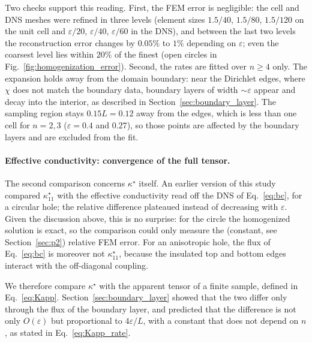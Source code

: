 \documentclass{article}
\begin{document}
Two checks support this reading. First, the FEM error is negligible: the cell
and DNS meshes were refined in three levels (element sizes $1.5/40$, $1.5/80$,
$1.5/120$ on the unit cell and $\varepsilon/20$, $\varepsilon/40$, $\varepsilon/60$
in the DNS), and between the last two levels the reconstruction error changes
by $0.05\%$ to $1\%$ depending on $\varepsilon$; even the coarsest level lies
within $20\%$ of the finest (open circles in Fig.~\ref{fig:homogenization_error}).
Second, the rates are fitted over $n \geq 4$ only. The expansion holds away
from the domain boundary: near the Dirichlet edges, where $\chi$ does not match
the boundary data, boundary layers of width $\sim\varepsilon$ appear and decay
into the interior, as described in Section~\ref{sec:boundary_layer}. The sampling region stays $0.15 L = 0.12$ away from the edges,
which is less than one cell for $n = 2, 3$ ($\varepsilon = 0.4$ and $0.27$), so those
points are affected by the boundary layers and are excluded from the fit.

\paragraph{Effective conductivity: convergence of the full tensor.} The second
comparison concerns $\kappa^{\star}$ itself. An earlier version of this study
compared $\kappa^{\star}_{11}$ with the effective conductivity read off the DNS of
Eq.~\eqref{eq:bc}, for a circular hole; the relative difference plateaued instead
of decreasing with $\varepsilon$. Given the discussion above, this is no surprise:
for the circle the homogenized solution is exact, so the comparison could only
measure the (constant, see Section~\ref{sec:p2}) relative FEM error. For an
anisotropic hole, the flux of Eq.~\eqref{eq:bc} is moreover not
$\kappa^{\star}_{11}$, because the insulated top and bottom edges interact with
the off-diagonal coupling.

We therefore compare $\kappa^{\star}$ with the apparent tensor of a finite sample,
defined in Eq.~\eqref{eq:Kapp}. Section~\ref{sec:boundary_layer} showed that the two
differ only through the flux of the boundary layer, and predicted that the difference is
not only $O(\varepsilon)$ but proportional to $4\varepsilon/L$, with a constant that does
not depend on $n$, as stated in Eq.~\eqref{eq:Kapp_rate}.
\end{document}
